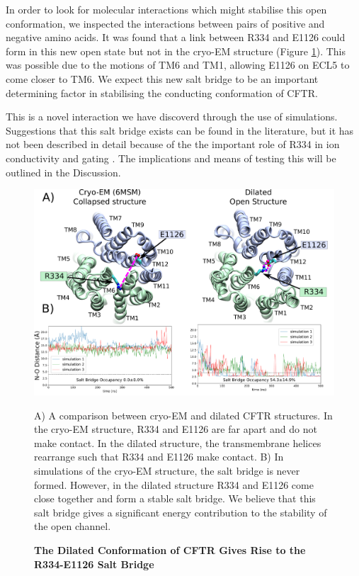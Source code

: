 In order to look for molecular interactions which might stabilise this open conformation, we inspected the interactions between pairs of positive and negative amino acids. It was found that a link between R334 and  E1126 could form in this new open state but not in the cryo-EM structure (Figure \ref{salt_bridge_fig}). This was possible due to the motions of TM6 and TM1, allowing E1126 on ECL5 to come closer to TM6. We expect this new salt bridge to be an important determining factor in stabilising the conducting conformation of CFTR.  

This is a novel interaction we have discoverd through the use of simulations.  Suggestions that this salt bridge exists can be found in the literature, but it has not been described in detail because of the the important role of R334 in ion conductivity and gating \cite{}. The implications and means of testing this will be outlined in the Discussion.

\begin{figure}
	\label{salt_bridge_fig}
	\begin{center}
		\includegraphics[width=1\textwidth]{figures/opening/salt_bridge_E1126_R334_figure.pdf}
	\end{center}
	\captionsetup{singlelinecheck = false, justification=raggedright}
	\caption[The Dilated Conformation of CFTR Gives Rise to the R334-E1126 Salt Bridge] {\textbf{The Dilated Conformation of CFTR Gives Rise to the R334-E1126 Salt Bridge}}{A) A comparison between cryo-EM and dilated CFTR structures. In the cryo-EM structure, R334 and E1126 are far apart and do not make contact. In the dilated structure, the transmembrane helices rearrange such that R334 and E1126 make contact. B) In simulations of the cryo-EM structure, the salt bridge is never formed. However, in the dilated structure R334 and E1126 come close together and form a stable salt bridge. We believe that this salt bridge gives a significant energy contribution to the stability of the open channel. }
\end{figure}

